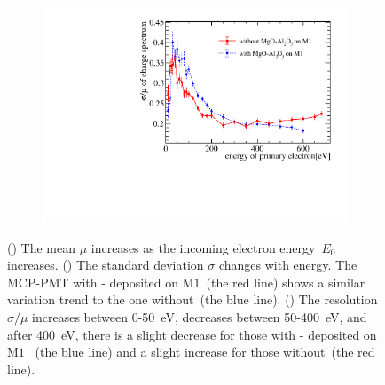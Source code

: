 \begin{figure}[!ht]
\begin{subfigure}[b]{0.325\textwidth}
		\includegraphics[width=\textwidth]{PMTRelated/GTmodel/gain_sigmamu.pdf}
		\caption{}
		\label{fig:sigmamu}
	\end{subfigure}
	\caption{() The mean \(\mu\) increases as the incoming electron energy~$E_0$ increases.
		() The standard deviation \(\sigma\) changes with energy.
		The MCP-PMT with - deposited on $\mathrm{M}1$~(the red line) shows a similar variation trend to the one without~(the blue line).
		() The resolution $\sigma/\mu$ increases between 0-\SI{50}{eV}, decreases between 50-\SI{400}{eV},
		and after \SI{400}{eV}, there is a slight decrease for those with - deposited on $\mathrm{M}1$ ~(the blue line) and a slight increase for those without~(the red line).
	}
	\label{fig:gaintest}
\end{figure}

